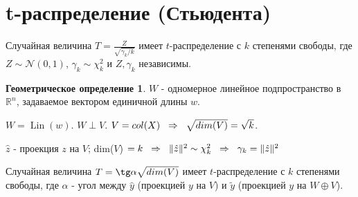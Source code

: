 \documentclass[12pt]{article} %
\theoremstyle{definition} %
\DeclareMathOperator{\Lin}{Lin}
\begin{document}
\section{t-распределение (Стьюдента)}

\begin{classic_def}
    Случайная величина $T = \frac{Z}{\sqrt{\gamma_k / k}}$ имеет $t$-распределение с $k$ степенями свободы, где $Z \sim \mathcal{N}(0,1)$, $\gamma_k \sim \mathcal{\chi}_k^2 $ и $Z, \gamma_k$ независимы.
\end{classic_def}

\newtheorem*{geom_def}{Геометрическое определение}
\begin{geom_def}\hspace{1cm} \par
    \addlinespace
    $W$ - одномерное линейное подпространство в $\mathbb{R}^n$, задаваемое вектором единичной длины $w$. \par
    $W = \Lin (w)$. \hspace{0.2cm} $W \perp V$. \hspace{0.2cm} $V = col(X) \hspace{0.2cm} \Rightarrow \hspace{0.2cm} \sqrt{dim(V)} = \sqrt{k}$. \par
    $\hat z$ - проекция $z$ на $V$; dim($V$) $=k \hspace{0.2cm} \Rightarrow \hspace{0.2cm} \lVert \hat z \rVert ^2 \sim \mathcal{\chi}_k^2 \hspace{0.2cm} \Rightarrow \hspace{0.2cm} \gamma_k = \lVert \hat z \rVert ^2$ \par
    Случайная величина $T = \tg \alpha \sqrt{dim(V)}$ имеет $t$-распределение с $k$ степенями свободы, где $\alpha$ - угол между $\hat y$ (проекцией $y$ на $V$) и $\tilde y$ (проекцией $y$ на $W \oplus V$). 
\end{geom_def}
\end{document}
